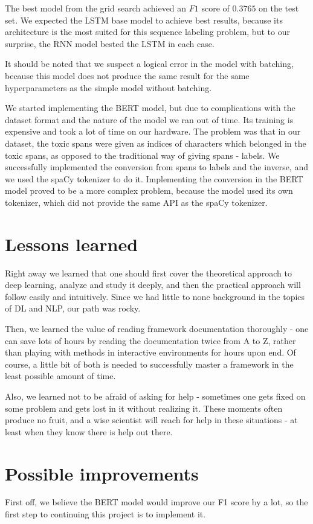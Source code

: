 \documentclass{article}
\begin{document}
The best model from the grid search achieved an $F1$ score of $0.3765$ on the test set. We expected the LSTM base model to achieve best results, because its architecture is the most suited for this sequence labeling problem, but to our surprise, the RNN model bested the LSTM in each case. 

It should be noted that we suspect a logical error in the model with batching, because this model does not produce the same result for the same hyperparameters as the simple model without batching. 

We started implementing the BERT model, but due to complications with the dataset format and the nature of the model we ran out of time. Its training is expensive and took a lot of time on our hardware. The problem was that in our dataset, the toxic spans were given as indices of characters which belonged in the toxic spans, as opposed to the traditional way of giving spans - labels. We successfully implemented the conversion from spans to labels and the inverse, and we used the spaCy tokenizer to do it. Implementing the conversion in the BERT model proved to be a more complex problem, because the model used its own tokenizer, which did not provide the same API as the spaCy tokenizer. 
\section{Lessons learned}
Right away we learned that one should first cover the theoretical approach to deep learning, analyze and study it deeply, and then the practical approach will follow easily and intuitively. Since we had little to none background in the topics of DL and NLP, our path was rocky.

Then, we learned the value of reading framework documentation thoroughly - one can save lots of hours by reading the documentation twice from A to Z, rather than playing with methods in interactive environments for hours upon end. Of course, a little bit of both is needed to successfully master a framework in the least possible amount of time.

Also, we learned not to be afraid of asking for help - sometimes one gets fixed on some problem and gets lost in it without realizing it. These moments often produce no fruit, and a wise scientist will reach for help in these situations - at least when they know there is help out there.

\section{Possible improvements}
First off, we believe the BERT model would improve our F1 score by a lot, so the first step to continuing this project is to implement it. 
\end{document}
